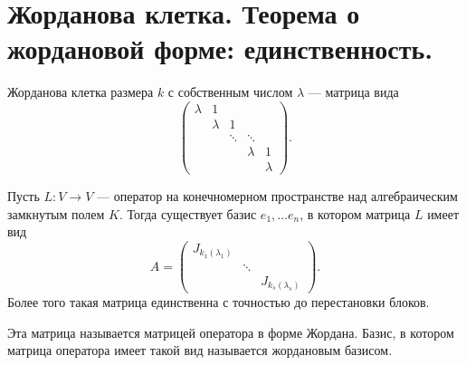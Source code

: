 \section{Жорданова клетка. Теорема о жордановой форме: единственность.}
\begin{defn}
    {\sf Жорданова клетка}   размера $ k$ с собственным числом  $ \lambda$ --- матрица вида
    \[
    \begin{pmatrix}
	\lambda & 1 & & & \\
		& \lambda & 1 & & \\
		& & \ddots & \ddots & \\
		& & & \lambda & 1 \\
		& & & & \lambda
    \end{pmatrix}
    .\] 
\end{defn}
\begin{thm}
    Пусть $ L\colon V \to  V$ --- оператор на конечномерном пространстве над алгебраическим  замкнутым полем $ K$. Тогда существует базис  $ e_1, \ldots e_n$, в котором матрица $ L$ имеет вид 
    \[
    A = 
    \begin{pmatrix}
	J_{k_1( \lambda _1)} & & \\
			    & \ddots &\\
			    & & J_{k_s( \lambda _s)}
    \end{pmatrix}
    .\] 
    Более того такая матрица единственна с точностью до перестановки блоков. 

    Эта матрица называется {\sf матрицей оператора в форме Жордана}. Базис, в котором матрица оператора имеет такой вид называется {\sf жордановым базисом}.   
\end{thm}

